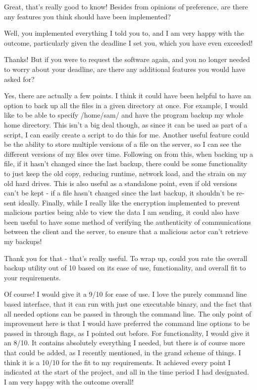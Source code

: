 \documentclass[../main.tex]{subfiles}
\begin{document}
\begin{qanda}
\Q Great, that’s really good to know! Besides from opinions of preference, are there any features you think should have been implemented? 

\A Well, you implemented everything I told you to, and I am very happy with the outcome, particularly given the deadline I set you, which you have even exceeded! 

\Q Thanks! But if you were to request the software again, and you no longer needed to worry about your deadline, are there any additional features you would have asked for? 

\A Yes, there are actually a few points. I think it could have been helpful to have an option to back up all the files in a given directory at once. For example, I would like to be able to specify /home/sam/ and have the program backup my whole home directory. This isn’t a big deal though, as since it can be used as part of a script, I can easily create a script to do this for me. Another useful feature could be the ability to store multiple versions of a file on the server, so I can see the different versions of my files over time. Following on from this, when backing up a file, if it hasn’t changed since the last backup, there could be some functionality to just keep the old copy, reducing runtime, network load, and the strain on my old hard drives. This is also useful as a standalone point, even if old versions can’t be kept - if a file hasn’t changed since the last backup, it shouldn’t be re-sent ideally. Finally, while I really like the encryption implemented to prevent malicious parties being able to view the data I am sending, it could also have been useful to have some method of verifying the authenticity of communications between the client and the server, to ensure that a malicious actor can’t retrieve my backups! 

\Q Thank you for that - that’s really useful. To wrap up, could you rate the overall backup utility out of 10 based on its ease of use, functionality, and overall fit to your requirements. 

\A Of course! I would give it a 9/10 for ease of use. I love the purely command line based interface, that it can run with just one executable binary, and the fact that all needed options can be passed in through the command line. The only point of improvement here is that I would have preferred the command line options to be passed in through flags, as I pointed out before. For functionality, I would give it an 8/10. It contains absolutely everything I needed, but there is of course more that could be added, as I recently mentioned, in the grand scheme of things. I think it is a 10/10 for the fit to my requirements. It achieved every point I indicated at the start of the project, and all in the time period I had designated. I am very happy with the outcome overall!

\end{qanda}
\end{document}
